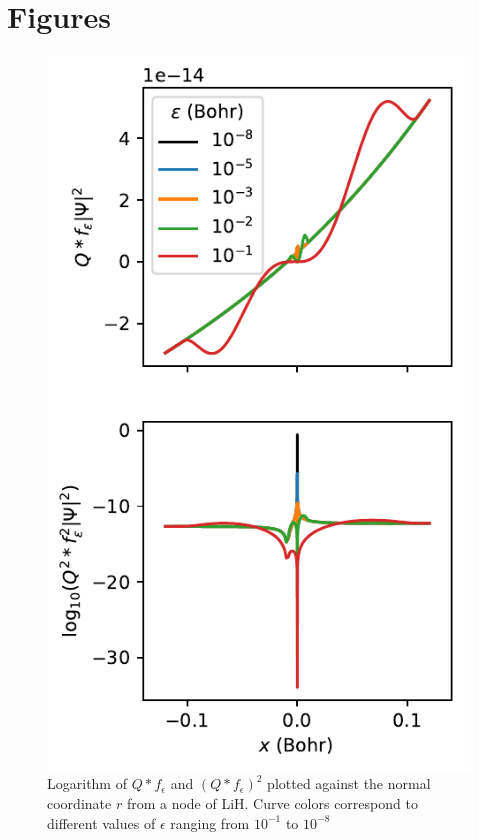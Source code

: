 \documentclass{article}
\begin{document}
\section{Figures}
\begin{figure}
\centering
\includegraphics{../plots/viznode.pdf}
\caption{Logarithm of $Q * f_\epsilon$ and $(Q * f_\epsilon)^2$ plotted against the normal coordinate $r$ from a node of LiH. Curve colors correspond to different values of $\epsilon$ ranging from $10^{-1}$ to $10^{-8}$}
\end{figure}
\end{document}
